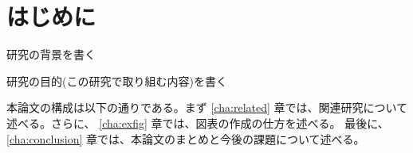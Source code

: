 \documentclass[main]{subfiles}
\begin{document}
\chapter{はじめに}
\label{cha:intro}

研究の背景を書く

研究の目的(この研究で取り組む内容)を書く

本論文の構成は以下の通りである。まず \ref{cha:related} 章では、関連研究について述べる。さらに、
\ref{cha:exfig} 章では、図表の作成の仕方を述べる。
最後に、\ref{cha:conclusion} 章では、本論文のまとめと今後の課題について述べる。
\end{document}
